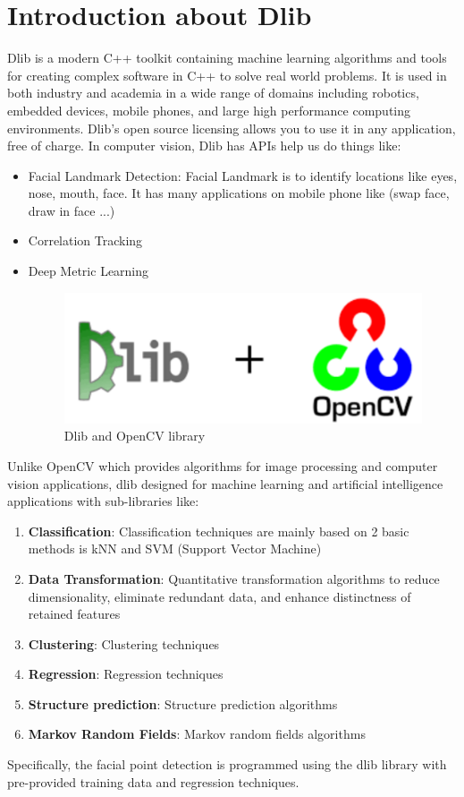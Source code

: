 \section{Introduction about Dlib}
    Dlib is a modern C++ toolkit containing machine learning algorithms and tools for creating complex software in C++ to solve real world problems. It is used in both industry 
    and academia in a wide range of domains including robotics, embedded devices, mobile phones, and large high performance computing environments. Dlib's open source licensing 
    allows you to use it in any application, free of charge. In computer vision, Dlib has APIs help us do things like:
    \begin{itemize}
        \item Facial Landmark Detection: Facial Landmark is to identify locations like eyes, nose, mouth, face. It has many applications on mobile phone like (swap face, draw in face ...)
        \item Correlation Tracking
        \item Deep Metric Learning 
        \begin{figure}[H]
            \centering
            \includegraphics[width=0.6\linewidth]{img/dlib+opencv.png}
            \caption{Dlib and OpenCV library}
        \end{figure} 
    \end{itemize}
    Unlike OpenCV which provides algorithms for image processing and computer vision applications, dlib designed for machine learning and artificial intelligence applications 
    with sub-libraries like: 
    \begin{enumerate}
        \item \textbf{Classification}: Classification techniques are mainly based on 2 basic methods is kNN and SVM (Support Vector Machine) 
        \item \textbf{Data Transformation}: Quantitative transformation algorithms to reduce dimensionality, eliminate redundant data, and enhance distinctness of retained features
        \item \textbf{Clustering}: Clustering techniques
        \item \textbf{Regression}: Regression techniques
        \item \textbf{Structure prediction}: Structure prediction algorithms 
        \item \textbf{Markov Random Fields}: Markov random fields algorithms
    \end{enumerate}
    Specifically, the facial point detection is programmed using the dlib library with pre-provided training data and regression techniques.

